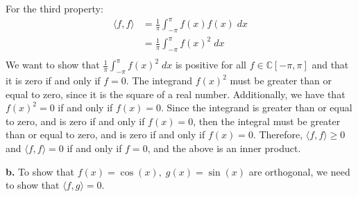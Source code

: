\documentclass{article}
\begin{document}
\noindent For the third property: \\
\begin{align*}
    \langle f, f \rangle &= \frac{1}{\pi} \int_{-\pi}^{\pi} f(x)f(x)\;dx \\
    &= \frac{1}{\pi} \int_{-\pi}^{\pi} f(x)^2\;dx \\
\end{align*}
We want to show that $\frac{1}{\pi} \int_{-\pi}^{\pi} f(x)^2\;dx$ is positive for all $f \in \mathbb{C}[-\pi, \pi]$ and that it is zero if and only if $f = 0$.
The integrand $f(x)^2$ must be greater than or equal to zero, since it is the square of a real number.
Additionally, we have that $f(x)^2 = 0$ if and only if $f(x) = 0$.
Since the integrand is greater than or equal to zero, and is zero if and only if $f(x) = 0$, then the integral must be greater than or equal to zero, and is zero if and only if $f(x) = 0$.
Therefore, $\langle f, f \rangle \geq 0$ and $\langle f, f \rangle = 0$ if and only if $f = 0$,
and the above is an inner product.

\vspace{0.25cm}
\noindent\textbf{b.} To show that $f(x) = \cos(x), \; g(x) = \sin(x)$ are orthogonal, we need to show that $\langle f, g \rangle = 0$.
\end{document}
